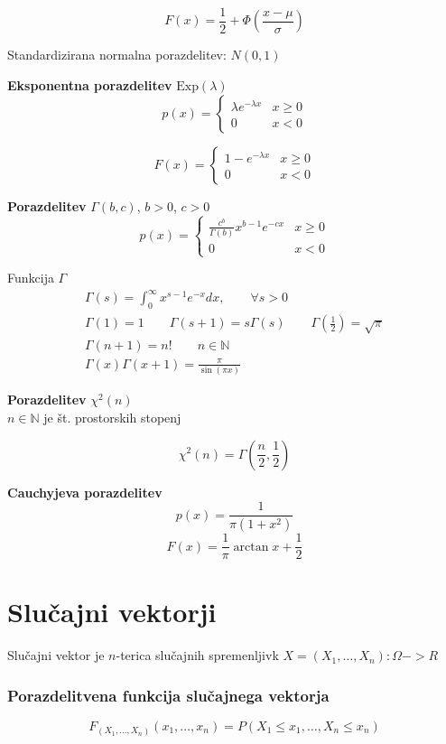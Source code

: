 \begin{multicols}{5}
\[ F(x) = \frac{1}{2} + \Phi\left(\frac{x-\mu}{\sigma}\right)\]

Standardizirana normalna porazdelitev: $N(0, 1)$

\textbf{Eksponentna porazdelitev} $\text{Exp}(\lambda)$
\[ p(x) = \begin{cases}
	\lambda e^{-\lambda x} & x \geq 0 \\
	0 & x < 0
\end{cases}\]

\[ F(x) = \begin{cases}
	1-e^{-\lambda x} & x \geq 0 \\
	0 & x < 0
\end{cases}\]


\textbf{Porazdelitev} $\Gamma(b,c)$, $b > 0$, $c > 0$
\[ p(x) = \begin{cases}
	\frac{c^b}{\Gamma(b)} x^{b-1} e^{-cx} & x \geq 0 \\
	0 & x < 0
\end{cases}\]

Funkcija $\Gamma$
\begin{gather*}
	\Gamma(s) = \int_0^{\infty} x^{s-1} e^{-x} dx, \qquad \forall s > 0 \\
	\Gamma(1) = 1 \qquad \Gamma(s+1) = s \Gamma(s) \qquad \Gamma(\frac{1}{2}) = \sqrt{\pi} \\
	\Gamma(n+1) = n!\qquad n\in \mathbb{N} \\ 
	\Gamma(x)\Gamma(x+1) = \frac{\pi}{\sin(\pi x)} 
\end{gather*}

\textbf{Porazdelitev} $\chi^2(n)$ \\
$n \in \mathbb{N}$ je št. prostorskih stopenj

\[ \chi^2(n) = \Gamma(\frac{n}{2}, \frac{1}{2})\]

\textbf{Cauchyjeva porazdelitev}
\[ p(x) = \frac{1}{\pi (1+x^2)}\]
\[ F(x) = \frac{1}{\pi} \arctan x + \frac{1}{2}\]

\section{Slučajni vektorji}
Slučajni vektor je $n$-terica slučajnih spremenljivk $X = (X_1, \dots , X_n): \Omega -> R$ 

\subsubsection{Porazdelitvena funkcija slučajnega vektorja}
\[ F_{(X_1, \dots , X_n)}(x_1, \dots , x_n) = P(X_1 \leq x_1, \dots , X_n \leq x_n)\]


\end{multicols}
